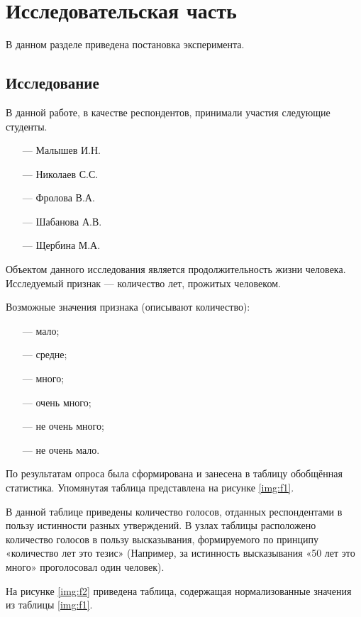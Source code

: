 \chapter{Исследовательская часть}

В данном разделе приведена постановка эксперимента.

\section{Исследование}

В данной работе, в качестве респондентов, принимали участия следующие студенты.
\begin{itemize}
	\item[---] Малышев И.Н.
	\item[---] Николаев С.С.
	\item[---] Фролова В.А.
	\item[---] Шабанова А.В.
	\item[---] Щербина М.А. 
\end{itemize}

Объектом данного исследования является продолжительность жизни человека. Исследуемый признак --- количество лет, прожитых человеком. 

Возможные значения признака (описывают количество):
\begin{itemize}
	\item[---] мало;
	\item[---] средне;
	\item[---] много;
	\item[---] очень много;
	\item[---] не очень много; 
	\item[---] не очень мало.
\end{itemize}

\newpage
По результатам опроса была сформирована и занесена в таблицу обобщённая статистика. Упомянутая таблица представлена на рисунке \ref{img:f1}.


В данной таблице приведены количество голосов, отданных респондентами в пользу истинности разных утверждений. В узлах таблицы расположено количество голосов в пользу высказывания, формируемого по принципу  «количество лет это тезис» (Например, за истинность высказывания «50 лет это много» проголосовал один человек).

На рисунке \ref{img:f2} приведена таблица, содержащая нормализованные значения из таблицы \ref{img:f1}.

